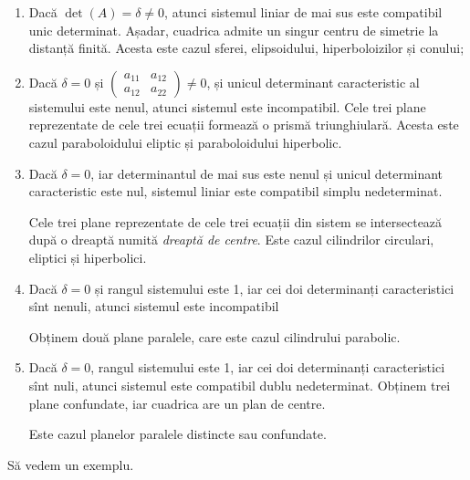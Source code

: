 \begin{enumerate}[(1)]
	\item Dacă $\det(A) = \delta \neq 0$, atunci sistemul liniar de mai sus
este compatibil unic determinat. Așadar, cuadrica admite un singur centru
de simetrie la distanță finită. Acesta este cazul sferei, elipsoidului,
hiperboloizilor și conului;
    \item Dacă $\delta = 0$ și $\begin{pmatrix}
	                                a_{11} & a_{12} \\
	                                a_{12} & a_{22}
                                \end{pmatrix} \neq 0$,
și unicul determinant caracteristic al sistemului este nenul, atunci sistemul
este incompatibil. Cele trei plane reprezentate de cele trei ecuații formează
o prismă triunghiulară. Acesta este cazul paraboloidului eliptic și
paraboloidului hiperbolic.

    \item Dacă $\delta = 0$, iar determinantul de mai sus este nenul și
unicul determinant caracteristic este nul, sistemul liniar este compatibil
simplu nedeterminat.

Cele trei plane reprezentate de cele trei ecuații din sistem se intersectează
după o dreaptă numită \emph{dreaptă de centre}. Este cazul cilindrilor 
circulari, eliptici și hiperbolici.

    \item Dacă $\delta = 0$ și rangul sistemului este 1, iar cei doi 
determinanți caracteristici sînt nenuli, atunci sistemul este incompatibil

Obținem două plane paralele, care este cazul cilindrului parabolic.

    \item Dacă $\delta = 0$, rangul sistemului este 1, iar cei doi
determinanți caracteristici sînt nuli, atunci sistemul este compatibil dublu
nedeterminat. Obținem trei plane confundate, iar cuadrica are un plan de centre.

Este cazul planelor paralele distincte sau confundate.
\end{enumerate}

Să vedem un exemplu.

